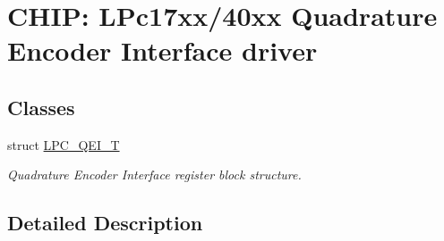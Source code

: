 \hypertarget{group__QEI__17XX__40XX}{}\section{C\+H\+IP\+: L\+Pc17xx/40xx Quadrature Encoder Interface driver}
\label{group__QEI__17XX__40XX}
\subsection*{Classes}
\begin{DoxyCompactItemize}
\item 
struct \hyperlink{structLPC__QEI__T}{L\+P\+C\+\_\+\+Q\+E\+I\+\_\+T}
\begin{DoxyCompactList}\small\item\em Quadrature Encoder Interface register block structure. \end{DoxyCompactList}\end{DoxyCompactItemize}


\subsection{Detailed Description}

